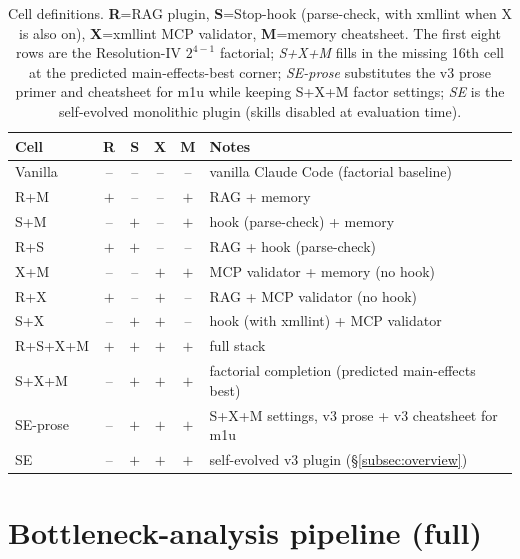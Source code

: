 \documentclass{article}
\begin{document}
\begin{table}[h]
  \caption{Cell definitions. \textbf{R}=RAG plugin, \textbf{S}=Stop-hook (parse-check, with xmllint when X is also on), \textbf{X}=xmllint MCP validator, \textbf{M}=memory cheatsheet. The first eight rows are the Resolution-IV $2^{4-1}$ factorial; \emph{S+X+M} fills in the missing 16th cell at the predicted main-effects-best corner; \emph{SE-prose} substitutes the v3 prose primer and cheatsheet for m1u while keeping S+X+M factor settings; \emph{SE} is the self-evolved monolithic plugin (skills disabled at evaluation time).}
  \label{tab:cells}
  \centering
  \small
  \begin{tabular}{lccccl}
    \toprule
    \textbf{Cell} & \textbf{R} & \textbf{S} & \textbf{X} & \textbf{M} & \textbf{Notes} \\
    \midrule
    Vanilla & --  & --  & --  & --  & vanilla Claude Code (factorial baseline)               \\
    R+M & $+$ & --  & --  & $+$ & RAG + memory                                           \\
    S+M & --  & $+$ & --  & $+$ & hook (parse-check) + memory                            \\
    R+S & $+$ & $+$ & --  & --  & RAG + hook (parse-check)                               \\
    X+M & --  & --  & $+$ & $+$ & MCP validator + memory (no hook)                       \\
    R+X & $+$ & --  & $+$ & --  & RAG + MCP validator (no hook)                          \\
    S+X & --  & $+$ & $+$ & --  & hook (with xmllint) + MCP validator                    \\
    R+S+X+M & $+$ & $+$ & $+$ & $+$ & full stack                                         \\
    \midrule
    S+X+M    & --  & $+$ & $+$ & $+$ & factorial completion (predicted main-effects best) \\
    SE-prose & --  & $+$ & $+$ & $+$ & S+X+M settings, v3 prose + v3 cheatsheet for m1u   \\
    SE       & --  & $+$ & $+$ & $+$ & self-evolved v3 plugin (\S\ref{subsec:overview})  \\
    \bottomrule
  \end{tabular}
\end{table}

\section{Bottleneck-analysis pipeline (full)}
\label{app:bottleneck}
\end{document}

